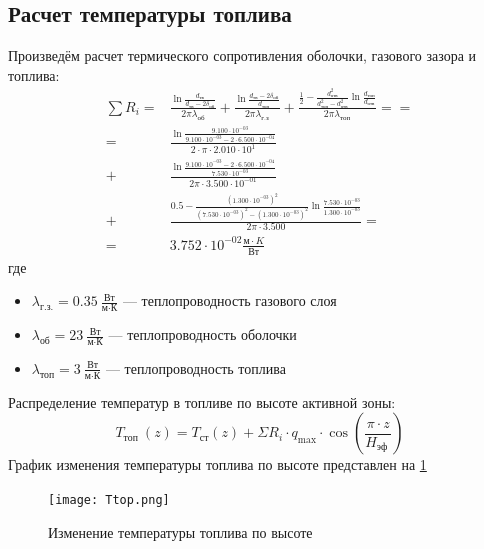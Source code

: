 \subsection{Расчет температуры топлива}
    Произведём расчет термического сопротивления оболочки, газового зазора и топлива:
\begin{align*}
\sum R_i =& 
\frac {\ln \frac {d_{\text{тв}}}{d_{\text{тв}} - 2\delta_{об}}  }{2\pi\lambda_{\text{об}}}+\frac {\ln \frac {d_{\text{тв}} - 2\delta_{об}}{d_{\text{топ}}}  }{2\pi\lambda_{\text{г.з}}}+\frac {\frac 1 2 - \frac {d_{\text{отв}}^2} {d_{\text{топ}}^2 - d_{\text{отв}}^2}\ln \frac {d_{\text{топ}}}{d_{\text{отв}}}} {2 \pi \lambda_{\text{топ}}} =
=\\=&
\frac {\ln \frac{ 9.100 \cdot 10^{ -03 } }{ 9.100 \cdot 10^{ -03 } - 2 \cdot 6.500 \cdot 10^{ -04 }} } {2\cdot \pi \cdot 2.010 \cdot 10^{ 1 }}
\\+& \frac {\ln \frac {9.100 \cdot 10^{ -03 } - 2 \cdot 6.500 \cdot 10^{ -04 }}{7.530 \cdot 10^{ -03 }} } {2 \pi \cdot 3.500 \cdot 10^{ -01 }}
\\+& \frac { 0.5 - \frac{ (1.300 \cdot 10^{ -03 })^2 }{ (7.530 \cdot 10^{ -03 })^2 - (1.300 \cdot 10^{ -03 })^2 } \ln \frac { 7.530 \cdot 10^{ -03 } }{ 1.300 \cdot 10^{ -03 } } } {2 \pi \cdot 3.500  }
=\\=&3.752 \cdot 10^{ -02 } \frac {\text{м} \cdot K}{\text{Вт}}
\end{align*}
где
\begin{itemize}
    \item $\lambda_{\text{г.з.}} = 0.35\  \frac {\text{Вт}}{\text{м} \cdot \text{К}}$ — теплопроводность газового слоя 
    \item $\lambda_{\text{об}} = 23\  \frac {\text{Вт}}{\text{м} \cdot \text{К}}$ — теплопроводность оболочки 
    \item $\lambda_{\text{топ}} = 3\  \frac {\text{Вт}}{\text{м} \cdot \text{К}}$ — теплопроводность топлива
\end{itemize}
Распределение температур в топливе по высоте активной зоны:
$$
T_{\text {топ }}(z)=T_{\mathrm{ст}}(z)+\Sigma R_{i} \cdot q_{\max } \cdot \cos \left(\frac{\pi \cdot z}{H_{\text {эф }}}\right)
$$
График изменения температуры топлива по высоте представлен на \ref{pic:top}
\begin{figure}[H]
	\begin{center}
		\texttt{[image: Ttop.png]}
		\caption{Изменение температуры топлива по высоте}
		\label{pic:top} %
	\end{center}
\end{figure}

